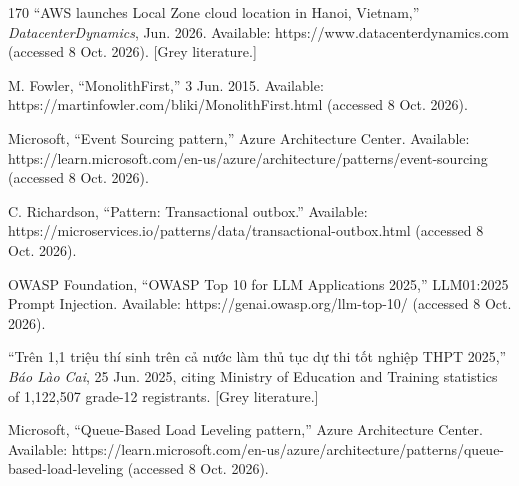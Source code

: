 \begin{thebibliography}{170}
 ``AWS launches Local Zone cloud location in Hanoi, Vietnam,'' \textit{DatacenterDynamics}, Jun. 2026. Available: https://www.datacenterdynamics.com (accessed 8 Oct. 2026). [Grey literature.]

 M. Fowler, ``MonolithFirst,'' 3 Jun. 2015. Available: https://martinfowler.com/bliki/MonolithFirst.html (accessed 8 Oct. 2026).

 Microsoft, ``Event Sourcing pattern,'' Azure Architecture Center. Available: https://learn.microsoft.com/en-us/azure/architecture/patterns/event-sourcing (accessed 8 Oct. 2026).

 C. Richardson, ``Pattern: Transactional outbox.'' Available: https://microservices.io/patterns/data/transactional-outbox.html (accessed 8 Oct. 2026).

 OWASP Foundation, ``OWASP Top 10 for LLM Applications 2025,'' LLM01:2025 Prompt Injection. Available: https://genai.owasp.org/llm-top-10/ (accessed 8 Oct. 2026).

 ``Trên 1,1 triệu thí sinh trên cả nước làm thủ tục dự thi tốt nghiệp THPT 2025,'' \textit{Báo Lào Cai}, 25 Jun. 2025, citing Ministry of Education and Training statistics of 1,122,507 grade-12 registrants. [Grey literature.]

 Microsoft, ``Queue-Based Load Leveling pattern,'' Azure Architecture Center. Available: https://learn.microsoft.com/en-us/azure/architecture/patterns/queue-based-load-leveling (accessed 8 Oct. 2026).
\end{thebibliography}
\endgroup
